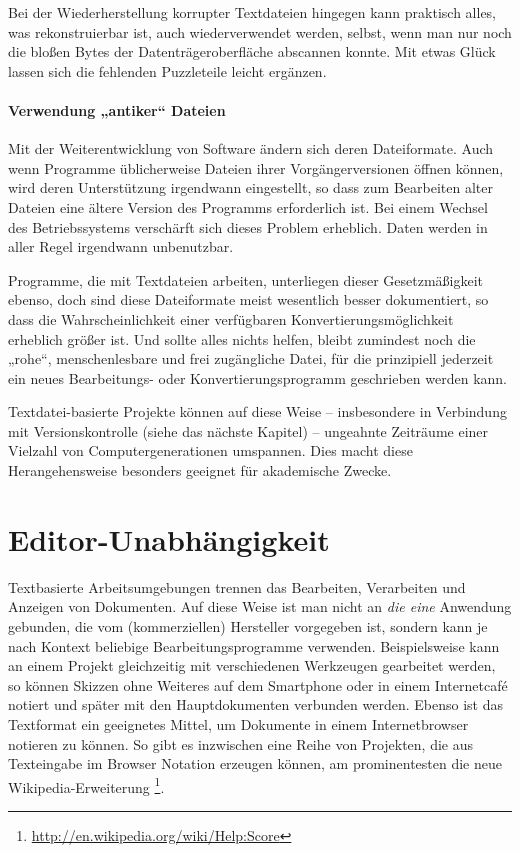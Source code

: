 \documentclass[DIV=12]{scrreprt}
\begin{document}
Bei der Wiederherstellung korrupter Textdateien hingegen kann praktisch alles, was rekonstruierbar ist, auch wiederverwendet werden, selbst, wenn man nur noch die bloßen Bytes der Datenträgeroberfläche abscannen konnte.
Mit etwas Glück lassen sich die fehlenden Puzzleteile leicht ergänzen.

\paragraph{Verwendung „antiker“ Dateien}
Mit der Weiterentwicklung von Software ändern sich deren Dateiformate.
Auch wenn Programme üblicherweise Dateien ihrer Vorgängerversionen öffnen können, wird deren Unterstützung irgendwann eingestellt, so dass zum Bearbeiten alter Dateien eine ältere Version des Programms erforderlich ist.
Bei einem Wechsel des Betriebssystems verschärft sich dieses Problem erheblich.
Daten werden in aller Regel irgendwann unbenutzbar.

Programme, die mit Textdateien arbeiten, unterliegen dieser Gesetzmäßigkeit ebenso, doch sind diese Dateiformate meist wesentlich besser dokumentiert, so dass die Wahrscheinlichkeit einer verfügbaren Konvertierungsmöglichkeit erheblich größer ist.
Und sollte alles nichts helfen, bleibt zumindest noch die „rohe“, menschenlesbare und frei zugängliche Datei, für die prinzipiell jederzeit ein neues Bearbeitungs- oder Konvertierungsprogramm geschrieben werden kann.

Textdatei-basierte Projekte können auf diese Weise -- insbesondere in Verbindung mit Versionskontrolle (siehe das nächste Kapitel) -- ungeahnte Zeiträume einer Vielzahl von Computergenerationen umspannen.
Dies macht diese Herangehensweise besonders geeignet für akademische Zwecke.

\section*{Editor-Unabhängigkeit}
\label{sec:pt_editor-independence}
Textbasierte Arbeitsumgebungen trennen das Bearbeiten, Verarbeiten und Anzeigen von Dokumenten.
Auf diese Weise ist man nicht an \emph{die eine} Anwendung gebunden, die vom (kommerziellen) Hersteller vorgegeben ist, sondern kann je nach Kontext beliebige Bearbeitungsprogramme verwenden.
Beispielsweise kann an einem Projekt gleichzeitig mit verschiedenen Werkzeugen gearbeitet werden, so können Skizzen ohne Weiteres auf dem Smartphone oder in einem Internetcafé notiert und später mit den Hauptdokumenten verbunden werden.
Ebenso ist das Textformat ein geeignetes Mittel, um Dokumente in einem Internetbrowser notieren zu können.
So gibt es inzwischen eine Reihe von Projekten, die aus Texteingabe im Browser Notation erzeugen können, am prominentesten die neue Wikipedia-Erweiterung%
\footnote{\url{http://en.wikipedia.org/wiki/Help:Score}}.
\end{document}
